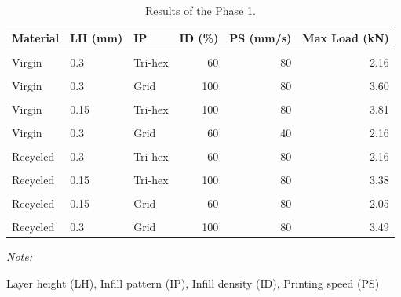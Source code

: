 \documentclass[]{interact}
\theoremstyle{plain}%
\theoremstyle{definition}
\theoremstyle{remark}
\begin{document}
\begin{table}

\caption{\label{tab:table.S2}Results of the Phase 1. \label{tab:phase1}}
\centering
\fontsize{7}{9}\selectfont
\begin{threeparttable}
\begin{tabular}[t]{lllrrr}
\toprule
Material & LH (mm) & IP & ID (\%) & PS (mm/s) & Max Load (kN)\\
\midrule
\cellcolor{gray!6}{Virgin} & \cellcolor{gray!6}{0.15} & \cellcolor{gray!6}{Tri-hex} & \cellcolor{gray!6}{60} & \cellcolor{gray!6}{40} & \cellcolor{gray!6}{2.21}\\
Virgin & 0.3 & Tri-hex & 60 & 80 & 2.16\\
\cellcolor{gray!6}{Virgin} & \cellcolor{gray!6}{0.15} & \cellcolor{gray!6}{Grid} & \cellcolor{gray!6}{60} & \cellcolor{gray!6}{80} & \cellcolor{gray!6}{2.24}\\
Virgin & 0.3 & Grid & 100 & 80 & 3.60\\
\cellcolor{gray!6}{Virgin} & \cellcolor{gray!6}{0.3} & \cellcolor{gray!6}{Tri-hex} & \cellcolor{gray!6}{100} & \cellcolor{gray!6}{40} & \cellcolor{gray!6}{3.62}\\
Virgin & 0.15 & Tri-hex & 100 & 80 & 3.81\\
\cellcolor{gray!6}{Virgin} & \cellcolor{gray!6}{0.15} & \cellcolor{gray!6}{Grid} & \cellcolor{gray!6}{100} & \cellcolor{gray!6}{40} & \cellcolor{gray!6}{3.79}\\
Virgin & 0.3 & Grid & 60 & 40 & 2.16\\
\cellcolor{gray!6}{Recycled} & \cellcolor{gray!6}{0.15} & \cellcolor{gray!6}{Tri-hex} & \cellcolor{gray!6}{60} & \cellcolor{gray!6}{40} & \cellcolor{gray!6}{2.16}\\
Recycled & 0.3 & Tri-hex & 60 & 80 & 2.16\\
\cellcolor{gray!6}{Recycled} & \cellcolor{gray!6}{0.3} & \cellcolor{gray!6}{Grid} & \cellcolor{gray!6}{60} & \cellcolor{gray!6}{40} & \cellcolor{gray!6}{2.15}\\
Recycled & 0.15 & Tri-hex & 100 & 80 & 3.38\\
\cellcolor{gray!6}{Recycled} & \cellcolor{gray!6}{0.3} & \cellcolor{gray!6}{Tri-hex} & \cellcolor{gray!6}{100} & \cellcolor{gray!6}{40} & \cellcolor{gray!6}{3.37}\\
Recycled & 0.15 & Grid & 60 & 80 & 2.05\\
\cellcolor{gray!6}{Recycled} & \cellcolor{gray!6}{0.15} & \cellcolor{gray!6}{Grid} & \cellcolor{gray!6}{100} & \cellcolor{gray!6}{40} & \cellcolor{gray!6}{3.53}\\
Recycled & 0.3 & Grid & 100 & 80 & 3.49\\
\bottomrule
\end{tabular}
\begin{tablenotes}
\item \textit{Note: } 
\item Layer height (LH), Infill pattern (IP), Infill density (ID), Printing speed (PS)
\end{tablenotes}
\end{threeparttable}
\end{table}
\end{document}
